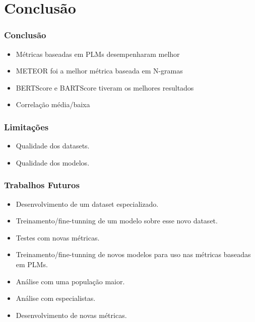 \section{Conclusão} %

\begin{frame}
    \frametitle{Conclusão}
    \begin{itemize}[<+(1)->]
        \item Métricas baseadas em PLMs desempenharam melhor
        \item METEOR foi a melhor métrica baseada em N-gramas
        \item BERTScore e BARTScore tiveram os melhores resultados
        \item Correlação média/baixa
    \end{itemize}
\end{frame}


\begin{frame}
    \frametitle{Limitações}
    \begin{itemize}
        \item Qualidade dos datasets.
        \item Qualidade dos modelos.
    \end{itemize}
\end{frame}


\begin{frame}
    \frametitle{Trabalhos Futuros}
    \begin{itemize}[<+(1)->]
        \item Desenvolvimento de um dataset especializado.
        \item Treinamento/fine-tunning de um modelo sobre esse novo dataset.
        \item Testes com novas métricas.
        \item Treinamento/fine-tunning de novos modelos para uso nas métricas baseadas em PLMs.
        \item Análise com uma população maior.
        \item Análise com especialistas.
        \item Desenvolvimento de novas métricas.
    \end{itemize}
\end{frame}